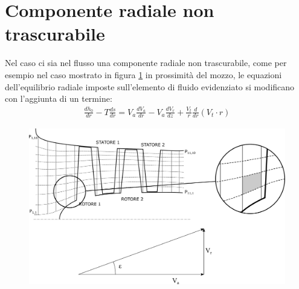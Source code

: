\section{Componente radiale non trascurabile}
Nel caso ci sia nel flusso una componente radiale non trascurabile, come per esempio nel caso mostrato in figura \ref{fd:comp_rad} in prossimità del mozzo, le equazioni dell'equilibrio radiale imposte sull'elemento di fluido evidenziato si modificano con l'aggiunta di un termine:
\begin{align*}
\frac{d h_0}{dr} - T\frac{ds}{dr} = V_a \frac{dV_a}{dr} - \boxed{V_a \frac{dV_r}{dz}} + \frac{V_t}{r} \frac{d}{dr} ( V_t \cdot r)
\end{align*}
\begin{figure}[h!]
	\centering
	\includegraphics[width=.8\textwidth]{fig/comp_rad.pdf}
	\caption{}
	\label{fd:comp_rad}
\end{figure}
